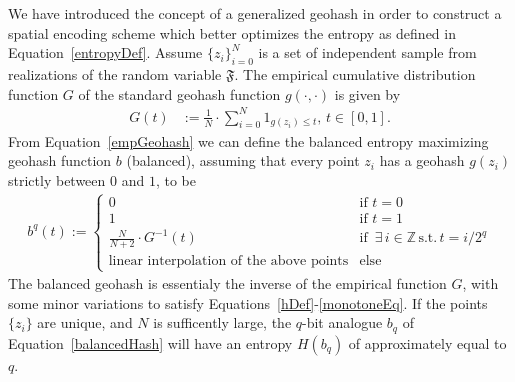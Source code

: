 \documentclass{article} %
\begin{document}
We have introduced the concept of a generalized geohash in order to construct a spatial encoding
scheme which better optimizes the entropy as defined in Equation~\ref{entropyDef}.
Assume $\{z_i\}_{i=0}^N$ is a set of independent sample from realizations of the random variable
$\mathfrak{F}$. The empirical cumulative distribution function $G$ of the standard geohash function
$g(\cdot, \cdot)$ is given by
\begin{align}
G(t) &:= \frac{1}{N} \cdot \sum_{i=0}^{N} 1_{g(z_i) \leq t}, \, t \in [0,1]. \label{empGeohash}
\end{align}
From Equation~\ref{empGeohash} we can define the balanced entropy maximizing geohash function
$b$ (balanced), assuming that every point $z_i$ has a geohash $g(z_i)$ strictly between $0$ and
$1$, to be
\begin{align}
b^q(t) :=
  \begin{cases}
    0 &\mbox{if } t = 0\\
    1 &\mbox{if } t = 1\\
    \frac{N}{N+2} \cdot G^{-1}(t) &\mbox{if } \, \exists \, i \in \mathbb{Z} \, \text{s.t.} \, t = i / 2^{q} \\
    \text{linear interpolation of the above points} & \text{else}
  \end{cases} \label{balancedHash}
\end{align}
The balanced geohash is essentialy the inverse of the empirical function $G$, with some minor
variations to satisfy Equations~\ref{hDef}-\ref{monotoneEq}.
If the points $\{z_i\}$ are unique, and $N$ is sufficently large, the $q$-bit analogue $b_q$
of Equation~\ref{balancedHash} will have an entropy $H(b_q)$ of approximately equal to $q$.
\end{document}
